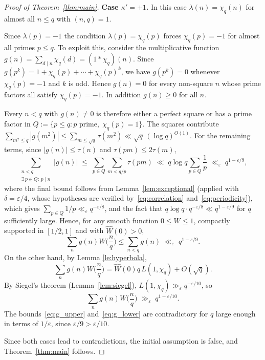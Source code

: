 \documentclass[11pt]{amsart}
\begin{document}
\begin{proof}[Proof of Theorem~\ref{thm:main}]
\medskip
\noindent\textbf{Case $\kappa' = +1$.}
In this case $\lambda(n) = \chi_q(n)$ for almost all
$n \leq q$ with $(n,q)=1$.
\medskip

Since $\lambda(p) = -1$ the condition $\lambda(p) = \chi_q(p)$ forces
$\chi_q(p) = -1$ for
almost all primes $p \leq q$.
To exploit this, consider the multiplicative function
$g(n) = \sum_{d \mid n} \chi_q(d) = (1 \ast \chi_q)(n)$.
Since $g(p^k) = 1 + \chi_q(p) + \cdots + \chi_q(p)^k$,
we have $g(p^k) = 0$ whenever $\chi_q(p) = -1$ and $k$ is
odd.
Hence $g(n) = 0$ for every non-square $n$ whose prime
factors all satisfy $\chi_q(p) = -1$. In addition $g(n) \geq 0$ for all $n$.

Every $n < q$ with $g(n) \neq 0$ is therefore either
a perfect square or has a prime factor in
$Q := \{p \leq q : p \text{ prime},\; \chi_q(p) = 1\}$.
The squares contribute
$\sum_{m^2 \leq q} |g(m^2)|
\leq \sum_{m \leq \sqrt{q}} \tau(m^2)
\ll \sqrt{q}\,(\log q)^{O(1)}$.
For the remaining terms, since
$|g(n)| \leq \tau(n)$ and $\tau(pm) \leq 2\tau(m)$,
\[
\sum_{\substack{n < q \\
\exists\, p \in Q:\, p \mid n}} |g(n)|
\;\leq\;
\sum_{p \in Q} \sum_{m < q/p} \tau(pm)
\;\ll\;
q \log q \sum_{p \in Q} \frac{1}{p}
\;\ll_\varepsilon\; q^{1-\varepsilon/9},
\]
where the final bound follows from
Lemma~\ref{lem:exceptional}
(applied with $\delta = \varepsilon/4$,
whose hypotheses are
verified by~\eqref{eq:correlation}
and~\eqref{eq:periodicity}),
which gives $\sum_{p \in Q} 1/p \ll_\varepsilon q^{-\varepsilon/8}$,
and the fact that $q \log q \cdot q^{-\varepsilon/8} \ll q^{1-\varepsilon/9}$
for $q$ sufficiently large.
Hence, for any smooth function $0 \leq W \leq 1$, compactly supported in $[1/2 ,1]$ and with $\widehat{W}(0) > 0$, 
\begin{equation}\label{eq:g_upper}
\sum_{n} g(n) W \Big ( \frac{n}{q} \Big ) \leq \sum_{n < q} g(n) \;\ll_\varepsilon\; q^{1-\varepsilon/9}.
\end{equation}
On the other hand, by Lemma \ref{le:hyperbola},
\[
\sum_{n} g(n) W \Big ( \frac{n}{q} \Big )
= \widehat{W}(0) q\, L(1,\chi_q) + O(\sqrt{q}).
\]
By Siegel's theorem (Lemma~\ref{lem:siegel}),
$L(1,\chi_q) \gg_\varepsilon q^{-\varepsilon/10}$, so
\begin{equation}\label{eq:g_lower}
\sum_{n} g(n) W \Big ( \frac{n}{q} \Big )\;\gg_\varepsilon\; q^{1-\varepsilon/10}.
\end{equation}
The bounds~\eqref{eq:g_upper} and~\eqref{eq:g_lower} are
contradictory for $q$ large enough in terms of
$1/\varepsilon$, since $\varepsilon / 9 > \varepsilon / 10$.

\medskip
Since both cases lead to contradictions, the initial
assumption is false, and Theorem~\ref{thm:main} follows.
\end{proof}
\end{document}
